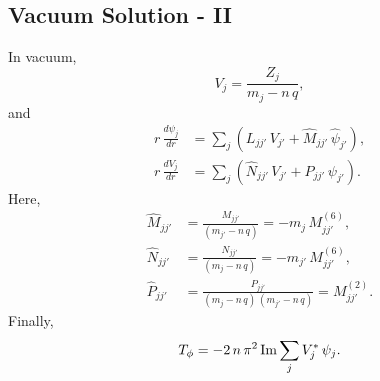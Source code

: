 \documentclass[12pt,prb,aps,notitlepage]{revtex4-1}
\begin{document}
\subsection{Vacuum Solution - II}
In vacuum,
\begin{equation}
V_j = \frac{Z_j}{m_j-n\,q},
\end{equation}
and
\begin{align}
r\,\frac{d\psi_j}{dr} &= \sum_j\left(L_{jj'}\,V_{j'} + \hat{M}_{jj'}\,\hat{\psi}_{j'}\right),\\[0.5ex]
r\,\frac{dV_j}{dr} &= \sum_j\left(\hat{N}_{jj'}\,V_{j'} + \hat{P}_{jj'}\,\psi_{j'}\right).
\end{align}
Here,
\begin{align}
\hat{M}_{jj'} &=\frac{M_{jj'}}{(m_{j'}-n\,q)}=-m_j\,M_{jj'}^{(6)},\\[0.5ex]
\hat{N}_{jj'} &=\frac{N_{jj'}}{(m_j-n\,q)}= -m_{j'}\,M_{jj'}^{(6)},\\[0.5ex]
\hat{P}_{jj'} &=\frac{P_{jj'}}{(m_j-n\,q)\,(m_{j'}-n\,q)}= M^{(2)}_{jj'}.
\end{align}
Finally,
\begin{equation}
T_\phi = -2\,n\,\pi^2\,{\rm Im}\sum_j V_j^\ast\,\psi_j.
\end{equation}
\end{document}
